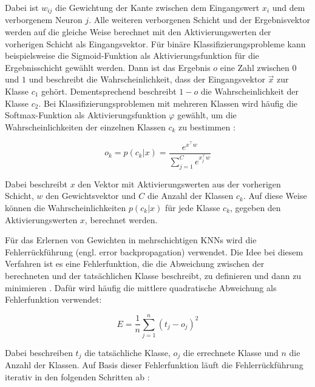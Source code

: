 Dabei ist $w_{ij}$ die Gewichtung der Kante zwischen dem Eingangswert $x_i$ und dem verborgenem Neuron $j$. Alle weiteren verborgenen Schicht und der Ergebnisvektor werden auf die gleiche Weise berechnet mit den Aktivierungswerten der vorherigen Schicht als Eingangsvektor. Für binäre Klassifizierungsprobleme kann beispielsweise die Sigmoid-Funktion als Aktivierungsfunktion für die Ergebnisschicht gewählt werden. Dann ist das Ergebnis $o$ eine Zahl zwischen $0$ und $1$ und beschreibt die Wahrscheinlichkeit, dass der Eingangsvektor $\vec{x}$ zur Klasse $c_1$ gehört. Dementsprechend beschreibt $1-o$ die Wahrscheinlichkeit der Klasse $c_2$. Bei Klassifizierungsproblemen mit mehreren Klassen wird häufig die Softmax-Funktion als Aktivierungsfunktion $\varphi$ gewählt, um die Wahrscheinlichkeiten der einzelnen Klassen $c_k$ zu bestimmen \cite{bridle1990probabilistic}:

\begin{equation}
o_k = p(c_k|x) = \frac{e^{x^\top w}}{\sum_{j=1}^Ce^{x_j^\top w}}
\end{equation}

Dabei beschreibt $x$ den Vektor mit Aktivierungswerten aus der vorherigen Schicht, $w$ den Gewichtsvektor und $C$ die Anzahl der Klassen $c_k$. Auf diese Weise können die Wahrscheinlichkeiten $p(c_k|x)$ für jede Klasse $c_k$, gegeben den Aktivierungswerten $x$, berechnet werden.

Für das Erlernen von Gewichten in mehrschichtigen \acp{KNN} wird die Fehlerrückführung (engl. error backpropagation) verwendet. Die Idee bei diesem Verfahren ist es eine Fehlerfunktion, die die Abweichung zwischen der berechneten und der tatsächlichen Klasse beschreibt, zu definieren und dann zu minimieren \cite{bishop2006pattern}. Dafür wird häufig die mittlere quadratische Abweichung als Fehlerfunktion verwendet:

\begin{equation}
E = \frac{1}{n}\sum_{j=1}^n(t_j-o_j)^2
\end{equation}

Dabei beschreiben $t_j$ die tatsächliche Klasse, $o_j$ die errechnete Klasse und $n$ die Anzahl der Klassen. Auf Basis dieser Fehlerfunktion läuft die Fehlerrückführung iterativ in den folgenden Schritten ab \cite{bishop2006pattern}:

